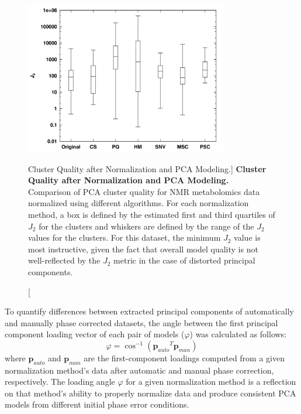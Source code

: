\begin{figure}
\includegraphics[width=3.5in]{figs/pscorr/02-allj2.png}
\caption
      [Cluster Quality after Normalization and PCA Modeling.]{
  {\bf Cluster Quality after Normalization and PCA Modeling.}
  \\
  Comparison of PCA cluster quality for \hnmr{} NMR metabolomics data
  normalized using different algorithms. For each normalization method, a
  box is defined by the estimated first and third quartiles of $J_2$ for the
  clusters and whiskers are defined by the range of the $J_2$ values for the
  clusters. For this dataset, the minimum $J_2$ value is most instructive,
  given the fact that overall model quality is not well-reflected by the
  $J_2$ metric in the case of distorted principal components.
}
\label{figure.6.2}
\end{figure}

\begin{doublespace}
To quantify differences between extracted principal components of automatically
and manually phase corrected datasets, the angle between the first principal
component loading vector of each pair of models ($\varphi$) was calculated as
follows:
\begin{equation}
\varphi = \cos^{-1}\left( {\mathbf{p}_{auto}}^T \mathbf{p}_{man} \right)
\end{equation}
where $\mathbf{p}_{auto}$ and $\mathbf{p}_{man}$ are the first-component
loadings computed from a given normalization method's data after automatic
and manual phase correction, respectively. The loading angle $\varphi$ for a
given normalization method is a reflection on that method's ability to properly
normalize data and produce consistent PCA models from different initial phase
error conditions.
\end{doublespace}

